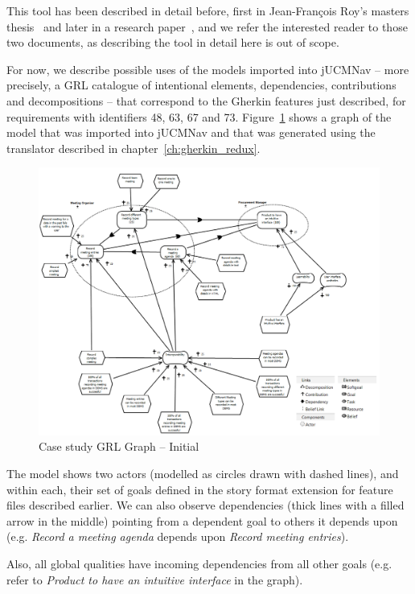 \documentclass[dissertation,final]{softeng}
\begin{document}
This tool has been described in detail before, first in Jean-François Roy's masters thesis~\citep{Roy:2007wyba} and later in a research paper~\citep{Amyot2010}, and we refer the interested reader to those two documents, as describing the tool in detail here is out of scope.

For now, we describe possible uses of the models imported into jUCMNav -- more precisely, a GRL catalogue of intentional elements, dependencies, contributions and decompositions -- that correspond to the Gherkin features just described, for requirements with identifiers 48, 63, 67 and 73. Figure~\ref{fig:InitialGRLGraph} shows a graph of the model that was imported into jUCMNav and that was generated using the translator described in chapter~\ref{ch:gherkin_redux}.

\begin{figure}
\includegraphics[width=\columnwidth]{casestudy-initial}
\centering
\caption{Case study GRL Graph -- Initial}
\label{fig:InitialGRLGraph}
\end{figure}

The model shows two actors (modelled as circles drawn with dashed lines), and within each, their set of goals defined in the story format extension for feature files described earlier. We can also observe dependencies (thick lines with a filled arrow in the middle) pointing from a dependent goal to others it depends upon (e.g. \emph{Record a meeting agenda} depends upon \emph{Record meeting entries}). 

Also, all global qualities have incoming dependencies from all other goals (e.g. refer to \emph{Product to have an intuitive interface} in the graph).
\end{document}
